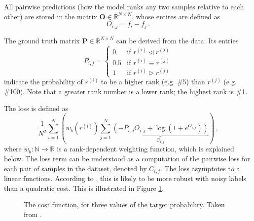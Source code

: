 All pairwise predictions (how the model ranks any two samples relative to each other) are stored in the matrix $\bm{O}\in\mathbb{R}^{N\times N}$, whose entires are defined as
\begin{equation}\label{eq:outputmatrix}
    O_{i,j}=f_i-f_j\,.
\end{equation}

The ground truth matrix $\bm{P}\in\mathbb{R}^{N\times N}$ can be derived from the data. Its entries\begin{equation}\label{eq:groundtruthmatrix}
    P_{i,j}=\begin{cases}
        0&\text{if }r^{(i)}\triangleleft r^{(j)}\\
        0.5&\text{if }r^{(i)}\equiv r^{(j)}\\
        1&\text{if }r^{(i)}\triangleright r^{(j)}
    \end{cases}
\end{equation}indicate the probability of $r^{(i)}$ to be a higher rank (e.g. \#5) than $r^{(j)}$ (e.g. \#100). Note that a greater rank number is a lower rank; the highest rank is \#1.

The loss is defined as
\begin{equation}
    \label{eq:loss}
    \frac{1}{N^2}\sum_{i=1}^N\left(
        w_b\left(r^{(i)}\right)\sum_{j=1}^N
            \underbrace{\left(-P_{i,j}O_{i,j}+\log\left(1+e^{\displaystyle O_{i,j}}\right)\right)}_{C_{i,j}}
    \right)\,,
\end{equation}where $w_b:\mathbb{N}\rightarrow\mathbb{R}$ is a rank-dependent weighting function, which is explained below. The loss term can be understood as a computation of the pairwise loss for each pair of samples in the dataset, denoted by $C_{i,j}$. The loss asymptotes to a linear functions. According to \cite{Burges:learningtorankwithsgd}, this is likely to be more robust with noisy labels than a quadratic cost. This is illustrated in Figure \ref{fig:costfn}.

\begin{figure}\centering
    \caption{The cost function, for three values of the target probability. Taken from \cite{Burges:learningtorankwithsgd}.}\label{fig:costfn}
\end{figure}


